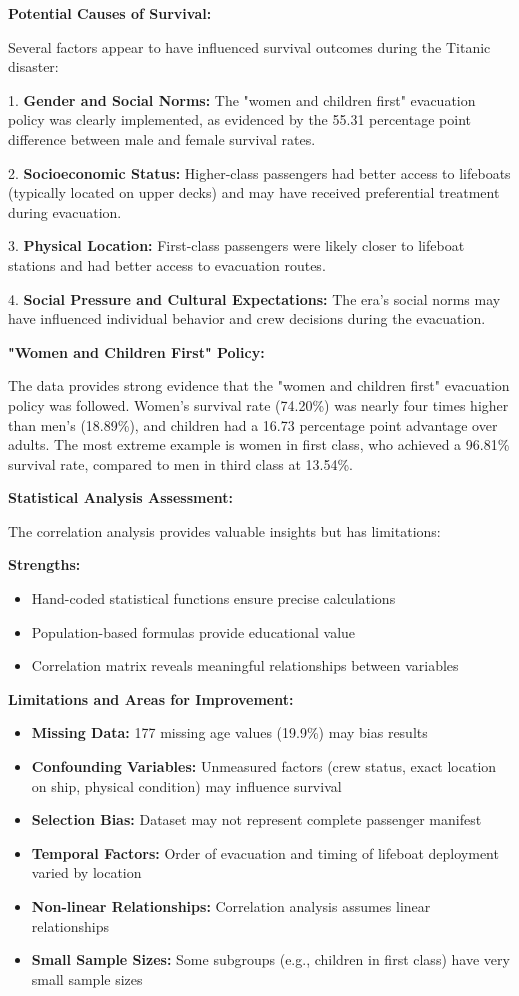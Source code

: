 \documentclass[letterpaper, 10 pt, conference]{ieeeconf}  %
\begin{document}
\textbf{Potential Causes of Survival:}

Several factors appear to have influenced survival outcomes during the Titanic disaster:

1. \textbf{Gender and Social Norms:} The "women and children first" evacuation policy was clearly implemented, as evidenced by the 55.31 percentage point difference between male and female survival rates.

2. \textbf{Socioeconomic Status:} Higher-class passengers had better access to lifeboats (typically located on upper decks) and may have received preferential treatment during evacuation.

3. \textbf{Physical Location:} First-class passengers were likely closer to lifeboat stations and had better access to evacuation routes.

4. \textbf{Social Pressure and Cultural Expectations:} The era's social norms may have influenced individual behavior and crew decisions during the evacuation.

\textbf{"Women and Children First" Policy:}

The data provides strong evidence that the "women and children first" evacuation policy was followed. Women's survival rate (74.20\%) was nearly four times higher than men's (18.89\%), and children had a 16.73 percentage point advantage over adults. The most extreme example is women in first class, who achieved a 96.81\% survival rate, compared to men in third class at 13.54\%.

\textbf{Statistical Analysis Assessment:}

The correlation analysis provides valuable insights but has limitations:

\textbf{Strengths:}
\begin{itemize}
\item Hand-coded statistical functions ensure precise calculations
\item Population-based formulas provide educational value
\item Correlation matrix reveals meaningful relationships between variables
\end{itemize}

\textbf{Limitations and Areas for Improvement:}
\begin{itemize}
\item \textbf{Missing Data:} 177 missing age values (19.9\%) may bias results
\item \textbf{Confounding Variables:} Unmeasured factors (crew status, exact location on ship, physical condition) may influence survival
\item \textbf{Selection Bias:} Dataset may not represent complete passenger manifest
\item \textbf{Temporal Factors:} Order of evacuation and timing of lifeboat deployment varied by location
\item \textbf{Non-linear Relationships:} Correlation analysis assumes linear relationships
\item \textbf{Small Sample Sizes:} Some subgroups (e.g., children in first class) have very small sample sizes
\end{itemize}
\end{document}
